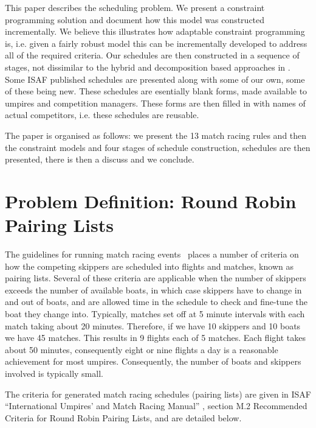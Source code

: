 \documentclass{llncs}
\begin{document}
This paper describes the scheduling problem. We present a constraint programming solution and document how this model was constructed incrementally. We believe this illustrates how adaptable constraint programming is, i.e. given a fairly robust model this can be incrementally developed to address all of the required criteria. Our schedules are then constructed in a sequence of stages, not dissimilar to the hybrid and decomposition based approaches in \cite{lombardi2012}. Some ISAF published schedules are presented along with some of our own, some of these being new.  These schedules are esentially blank forms, made available to umpires and competition managers. These forms are then filled in with names of actual competitors, i.e. these schedules are reusable.

The paper is organised as follows: we present the 13 match racing rules and then the constraint models and four stages of schedule construction, schedules are then presented, there is then a discuss and we conclude.


\section{Problem Definition: Round Robin Pairing Lists}\label{sec:definition}
The guidelines for running match racing events~\cite{isaf} places a number of criteria on how the competing skippers are scheduled into flights and matches, known as pairing lists. Several of these criteria are applicable when the number of skippers exceeds the number of available boats, in which case skippers have to change in and out of boats, and are allowed time in the schedule to check and fine-tune the boat they change into. Typically, matches set off at 5 minute intervals with each match taking about 20 minutes. Therefore, if we have 10 skippers and 10 boats we have 45 matches. This results in 9 flights each of 5 matches.  Each flight takes about 50 minutes, consequently eight or nine flights a day is a reasonable achievement for most umpires. Consequently, the number of boats and skippers involved is typically small.

The criteria for generated match racing schedules (pairing lists) are given in ISAF ``International Umpires' and Match Racing Manual'' \cite{isaf}, section
M.2 Recommended Criteria for Round Robin Pairing Lists, and are detailed below.
\end{document}

